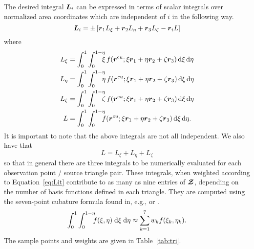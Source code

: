 The desired integral $\boldsymbol{L}_{i}$ can
be expressed in terms of scalar integrals over normalized area coordinates 
which are independent of $i$ in the
following way.
\begin{equation}
  \boldsymbol{L}_{i} = \pm  \left[
    \boldsymbol{r}_1 L_{\xi} + \boldsymbol{r}_2 L_{\eta} + \boldsymbol{r}_3 L_{\zeta}
    - \boldsymbol{r}_i L
  \right]    \label{eq:Lit}
\end{equation}
where
\begin{subequations}
  \begin{align}
    L_{\xi} &= \int_0^1 \int_0^{1-\eta}  \!\!\!\!
    \xi \, f(\rcu;\xi\r_1 + \eta\r_2 + \zeta\r_3)
    \, \d\xi \, \d\eta   \\
    L_{\eta} &= \int_0^1 \int_0^{1-\eta}  \!\!\!\!
    \eta \, f(\r^{cu};\xi\r_1 + \eta\r_2 + \zeta\r_3)
    \, \d\xi \, \d\eta   \\
    L_{\zeta} &= \int_0^1 \int_0^{1-\eta}  \!\!\!\!
    \zeta \, f(\r^{cu};\xi\r_1 + \eta\r_2 + \zeta\r_3)
    \, \d\xi \, \d\eta   \\
    L &=  \int_0^1 \int_0^{1-\eta}  \!\!\!\!
    f(\r^{cu};\xi\r_1 + \eta\r_2 + \zeta\r_3)
    \, \d\xi \, \d\eta.   \label{eq:L}
  \end{align}
\end{subequations}
It is important to note
that the above integrals are not all independent.  We also have that
\begin{equation}
  L = L_{\xi} + L_{\eta} + L_{\zeta}
\end{equation}
so that in general there are three integrals to be numerically evaluated for
each observation point / source triangle pair.  These integrals,
when weighted according to Equation~\eqref{eq:Lit} contribute
to as many as nine entries of $\boldsymbol{\mathcal{Z}}$, depending on the number of basis 
functions defined in each triangle.  They are computed using the seven-point
cubature formula found in, e.g., \cite{zien:71} or \cite{bali:84}.
\begin{equation}
    \int_0^1 \int_0^{1-\eta} \!\!\!
  f(\xi, \eta) \; \text{d}\xi \; \text{d}\eta \approx \sum_{k=1}^7 w_k f(\xi_k, \eta_k).
  \label{eq:cubtri}
\end{equation}
The sample points and weights are given in Table~\ref{tab:tri}.
